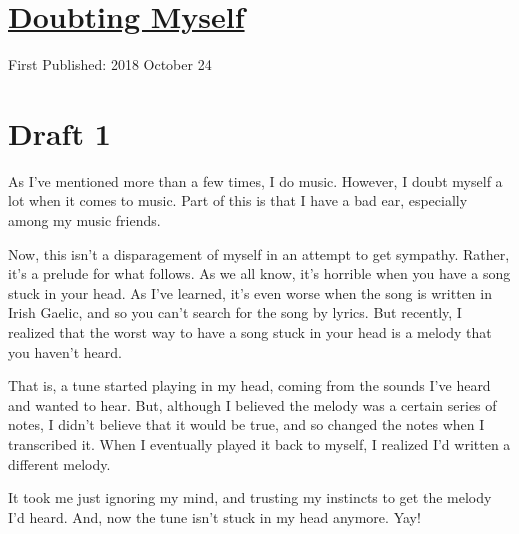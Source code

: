 \documentclass[12pt]{article}[titlepage]
\newcommand{\1}{\={a}}
\newcommand{\2}{\={e}}
\newcommand{\3}{\={\i}}
\newcommand{\4}{\=o}
\newcommand{\5}{\=u}
\newcommand{\6}{\={A}}
\renewcommand{\,}{\textsuperscript{,}}
\begin{document}
\doublespacing
\section{\href{doubting-myself.html}{Doubting Myself}}
First Published: 2018 October 24
\section{Draft 1}
As I've mentioned more than a few times, I do music.
However, I doubt myself a lot when it comes to music.
Part of this is that I have a bad ear, especially among my music friends.

Now, this isn't a disparagement of myself in an attempt to get sympathy.
Rather, it's a prelude for what follows.
As we all know, it's horrible when you have a song stuck in your head.
As I've learned, it's even worse when the song is written in Irish Gaelic, and so you can't search for the song by lyrics.
But recently, I realized that the worst way to have a song stuck in your head is a melody that you haven't heard.

That is, a tune started playing in my head, coming from the sounds I've heard and wanted to hear.
But, although I believed the melody was a certain series of notes, I didn't believe that it would be true, and so changed the notes when I transcribed it.
When I eventually played it back to myself, I realized I'd written a different melody.

It took me just ignoring my mind, and trusting my instincts to get the melody I'd heard.
And, now the tune isn't stuck in my head anymore.
Yay!
\end{document}

